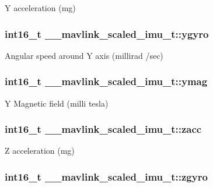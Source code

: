 Y acceleration (mg) 

\hypertarget{struct____mavlink__scaled__imu__t_a357d16590de8334390c67ddd5d3139b3}{
\subsubsection[{ygyro}]{\setlength{\rightskip}{0pt plus 5cm}int16\+\_\+t \+\_\+\+\_\+mavlink\+\_\+scaled\+\_\+imu\+\_\+t\+::ygyro}}\label{struct____mavlink__scaled__imu__t_a357d16590de8334390c67ddd5d3139b3}


Angular speed around Y axis (millirad /sec) 

\hypertarget{struct____mavlink__scaled__imu__t_a9a17a611fe6ec9e3f5a384cb1708e0e9}{
\subsubsection[{ymag}]{\setlength{\rightskip}{0pt plus 5cm}int16\+\_\+t \+\_\+\+\_\+mavlink\+\_\+scaled\+\_\+imu\+\_\+t\+::ymag}}\label{struct____mavlink__scaled__imu__t_a9a17a611fe6ec9e3f5a384cb1708e0e9}


Y Magnetic field (milli tesla) 

\hypertarget{struct____mavlink__scaled__imu__t_aa7263339399089b12c2874278033a5a1}{
\subsubsection[{zacc}]{\setlength{\rightskip}{0pt plus 5cm}int16\+\_\+t \+\_\+\+\_\+mavlink\+\_\+scaled\+\_\+imu\+\_\+t\+::zacc}}\label{struct____mavlink__scaled__imu__t_aa7263339399089b12c2874278033a5a1}


Z acceleration (mg) 

\hypertarget{struct____mavlink__scaled__imu__t_a907db6388e441e51dc12ca89fa6c557b}{
\subsubsection[{zgyro}]{\setlength{\rightskip}{0pt plus 5cm}int16\+\_\+t \+\_\+\+\_\+mavlink\+\_\+scaled\+\_\+imu\+\_\+t\+::zgyro}}\label{struct____mavlink__scaled__imu__t_a907db6388e441e51dc12ca89fa6c557b}


